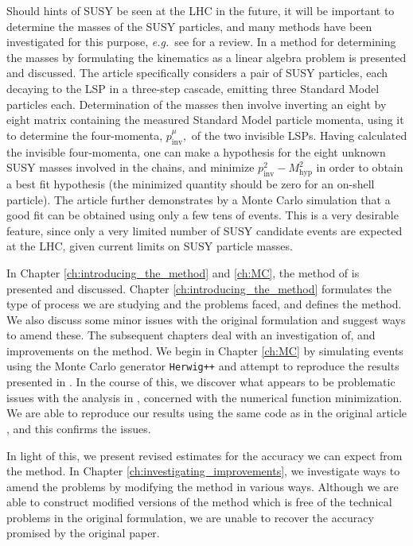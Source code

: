 \documentclass[twoside,english]{uiofysmaster}
\begin{document}
Should hints of SUSY be seen at the LHC in the future, it will be important to determine the masses of the SUSY particles, and many methods have been investigated for this purpose, {\it e.g.}~see \cite{Barr:2010zj} for a review. In \cite{Webber:2009vm} a method for determining the masses by formulating the kinematics as a linear algebra problem is presented and discussed. The article specifically considers a pair of SUSY particles, each decaying to the LSP in a three-step cascade, emitting three Standard Model particles each. Determination of the masses then involve inverting an eight by eight matrix containing the measured Standard Model particle momenta, using it to determine the four-momenta, $p^\mu_\mathrm{inv},$ of the two invisible LSPs. Having calculated the invisible four-momenta, one can make a hypothesis for the eight unknown SUSY masses involved in the chains, and minimize $p^2_\mathrm{inv}-M^2_\mathrm{hyp}$ in order to obtain a best fit hypothesis (the minimized quantity should be zero for an on-shell particle). The article further demonstrates by a Monte Carlo simulation that a good fit can be obtained using only a few tens of events. This is a very desirable feature, since only a very limited number of SUSY candidate events are  expected at the LHC, given current limits on SUSY particle masses.

In Chapter \ref{ch:introducing_the_method} and \ref{ch:MC}, the method of \cite{Webber:2009vm} is presented and discussed. Chapter \ref{ch:introducing_the_method} formulates the type of process we are studying and the problems faced, and defines the method. We also discuss some minor issues with the original formulation and suggest ways to amend these. The subsequent chapters deal with an investigation of, and improvements on the method. We begin in Chapter \ref{ch:MC} by simulating events using the Monte Carlo generator {\tt Herwig++} and attempt to reproduce the results presented in \cite{Webber:2009vm}. In the course of this, we discover what appears to be problematic issues with the analysis in \cite{Webber:2009vm}, concerned with the numerical function minimization. We are able to reproduce our results using the same code as in the original article \cite{Webber:epost}, and this confirms the issues.

In light of this, we present revised estimates for the accuracy we can expect from the method. In Chapter \ref{ch:investigating_improvements}, we investigate ways to amend the problems by modifying the method in various ways. Although we are able to construct modified versions of the method which is free of the technical problems in the original formulation, we are unable to recover the accuracy promised by the original paper.
\end{document}
